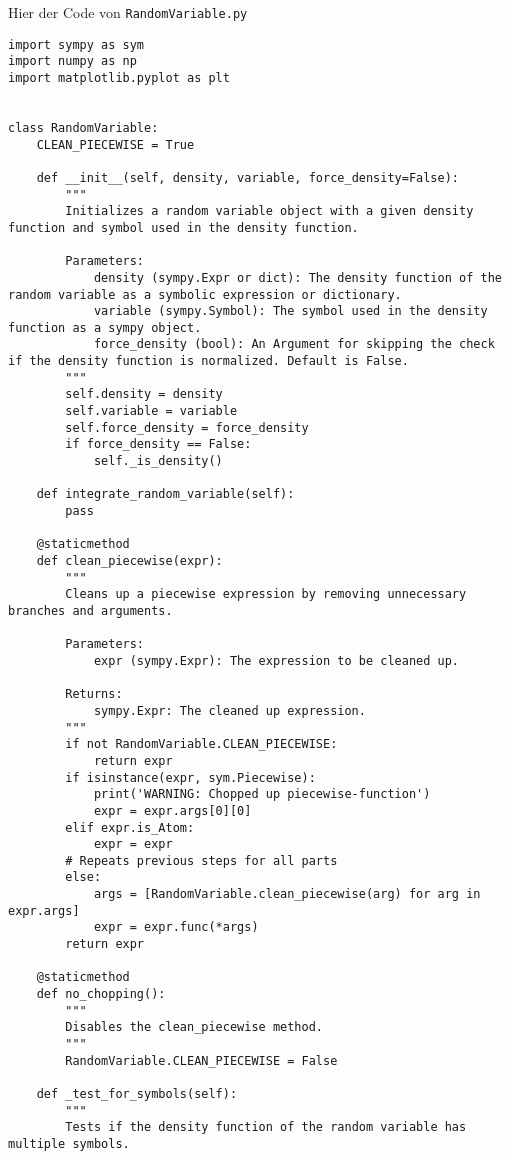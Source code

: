 Hier der Code von \lstinline|RandomVariable.py|
\begin{small}
\begin{lstlisting}
import sympy as sym
import numpy as np
import matplotlib.pyplot as plt


class RandomVariable:
    CLEAN_PIECEWISE = True

    def __init__(self, density, variable, force_density=False):
        """
        Initializes a random variable object with a given density function and symbol used in the density function.

        Parameters:
            density (sympy.Expr or dict): The density function of the random variable as a symbolic expression or dictionary.
            variable (sympy.Symbol): The symbol used in the density function as a sympy object.
            force_density (bool): An Argument for skipping the check if the density function is normalized. Default is False.
        """
        self.density = density
        self.variable = variable
        self.force_density = force_density
        if force_density == False:
            self._is_density()

    def integrate_random_variable(self):
        pass

    @staticmethod
    def clean_piecewise(expr):
        """
        Cleans up a piecewise expression by removing unnecessary branches and arguments.

        Parameters:
            expr (sympy.Expr): The expression to be cleaned up.

        Returns:
            sympy.Expr: The cleaned up expression.
        """
        if not RandomVariable.CLEAN_PIECEWISE:
            return expr
        if isinstance(expr, sym.Piecewise):
            print('WARNING: Chopped up piecewise-function')
            expr = expr.args[0][0]
        elif expr.is_Atom:
            expr = expr
        # Repeats previous steps for all parts
        else:
            args = [RandomVariable.clean_piecewise(arg) for arg in expr.args]
            expr = expr.func(*args)
        return expr

    @staticmethod
    def no_chopping():
        """
        Disables the clean_piecewise method.
        """
        RandomVariable.CLEAN_PIECEWISE = False

    def _test_for_symbols(self):
        """
        Tests if the density function of the random variable has multiple symbols.


\end{lstlisting}
\end{small}
